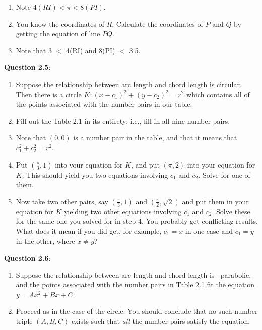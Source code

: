 \documentclass[english]{book}
\begin{document}
\begin{enumerate}
  \item[\hspace{1cm}2)] Note $4(RI) < \pi < 8(PI)$.
  \item[\hspace{1cm}3)] You know the coordinates of $R$. Calculate the coordinates of $P$ and $Q$ by getting the equation of line $PQ$.
  \item[\hspace{1cm}4)] Note that 3 $<$ 4(RI) and 8(PI) $<$ 3.5.
\end{enumerate}

\textbf{Question 2.5}:
\begin{enumerate}[\hspace{1cm}1)]
  \item Suppose the relationship between arc length and chord length is circular. Then there is a circle $K: (x-c_{1})^{2} + (y-c_{2})^{2} = r^{2}$ which contains all of the points associated with the number pairs in our table.
  \item Fill out the Table 2.1 in its entirety; i.e., fill in all nine number pairs.
  \item Note that $(0,0)$ is a number pair in the table, and that it means that $c_{1}^{2} + c_{2}^{2} = r^{2}$.
  \item Put $(\frac{\pi}{3}, 1)$ into your equation for $K$, and put $(\pi,2)$ into your equation for $K$. This should yield you two equations involving $c_{1}$ and $c_{2}$. Solve for one of them.
  \item Now take two other pairs, say $(\frac{\pi}{3},1)$ and $(\frac{\pi}{2}, \sqrt{2})$ and put them in your equation for $K$ yielding two other equations involving $c_{1}$ and $c_{2}$. Solve these for the same one you solved for in step 4. You probably get conflicting results. What does it mean if you did get, for example, $c_{1} = x$ in one case and $c_{1} = y$ in the other, where $x \neq y$?
\end{enumerate}

\textbf{Question 2.6}:
\begin{enumerate}[\hspace{1cm}1)]
  \item Suppose the relationship between arc length and chord length is $\ $ parabolic, and the points associated with the number pairs in Table 2.1 fit the equation $y = Ax^{2} + Bx + C$.
  \item Proceed as in the case of the circle. You should conclude that no such number triple $(A,B,C)$ exists such that \emph{all} the number pairs satisfy the equation.
\end{enumerate}
\end{document}
